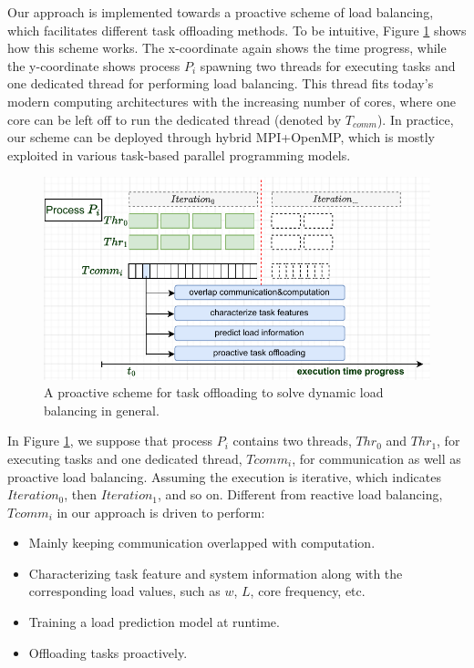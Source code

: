 Our approach is implemented towards a proactive scheme of load balancing, which facilitates different task offloading methods. To be intuitive, Figure \ref{fig:padlb_proact_scheme} shows how this scheme works. The x-coordinate again shows the time progress, while the y-coordinate shows process $P_{i}$ spawning two threads for executing tasks and one dedicated thread for performing load balancing. This thread fits today's modern computing architectures with the increasing number of cores, where one core can be left off to run the dedicated thread (denoted by $T_{comm}$). In practice, our scheme can be deployed through hybrid MPI+OpenMP, which is mostly exploited in various task-based parallel programming models.\\

\begin{figure}[t]
	\centering
	\includegraphics[scale=0.7]{./pictures/padlb_approach/padlb_proact_scheme.pdf}
	\caption{A proactive scheme for task offloading to solve dynamic load balancing in general.}
	\label{fig:padlb_proact_scheme}
\end{figure}

In Figure \ref{fig:padlb_proact_scheme}, we suppose that process $P_{i}$ contains two threads, $Thr_{0}$ and $Thr_{1}$, for executing tasks and one dedicated thread, $Tcomm_{i}$, for communication as well as proactive load balancing. Assuming the execution is iterative, which indicates $Iteration_{0}$, then $Iteration_{1}$, and so on. Different from reactive load balancing, $Tcomm_{i}$ in our approach is driven to perform:

\begin{itemize}
	\item Mainly keeping communication overlapped with computation.
	\item Characterizing task feature and system information along with the corresponding load values, such as $w$, $L$, core frequency, etc.
	\item Training a load prediction model at runtime.
	\item Offloading tasks proactively.
\end{itemize}

